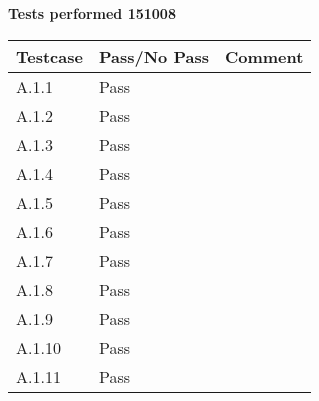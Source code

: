 \renewcommand{\testdate}{151008}
\textbf{ Tests performed \testdate}
\begin{center}
  		\begin{tabular}{| p{3cm} | p{5cm} | p{5cm} |}
    		\hline
	    	\textbf{Testcase}			& \textbf{Pass/No Pass} 	& \textbf{Comment} \\ \hline
    		A.1.1		 						& Pass  										&   \\ \hline
    		A.1.2		 						& Pass 										& 				 \\	\hline
    		A.1.3		 						& Pass 										& 				 \\	\hline
    		A.1.4		 						& Pass 										& 				 \\	\hline
    		A.1.5		 						& Pass 										& 				 \\	\hline
    		A.1.6		 						& Pass 										& 				 \\	\hline
    		A.1.7		 						& Pass 										& 				 \\	\hline
    		A.1.8		 						& Pass 										& 				 \\	\hline
    		A.1.9		 						& Pass 										& 				 \\	\hline
    		A.1.10	 							& Pass 										& 				 \\	\hline
    		A.1.11	 							& Pass 										& 				 \\	\hline
 		 \end{tabular}
\end{center}
	